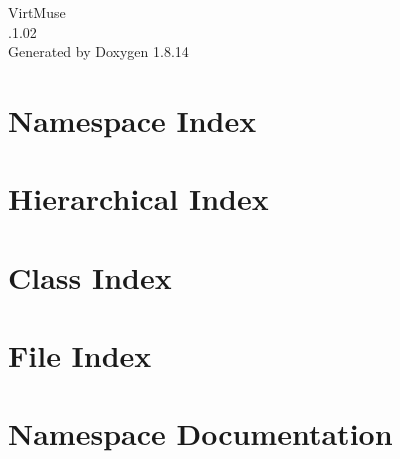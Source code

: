 \documentclass[twoside]{book}
\newcommand{\+}{\discretionary{\mbox{\scriptsize$\hookleftarrow$}}{}{}}
\newcommand{\clearemptydoublepage}{%
  \newpage{\pagestyle{empty}\cleardoublepage}%
}
\begin{document}
\hypersetup{pageanchor=false,
             bookmarksnumbered=true,
             pdfencoding=unicode
            }
\begin{titlepage}
\vspace*{7cm}
\begin{center}%
{\Large Virt\+Muse \\[1ex]\large .1.\+02 }\\
\vspace*{1cm}
{\large Generated by Doxygen 1.8.14}\\
\end{center}
\end{titlepage}
\clearemptydoublepage
{}
\tableofcontents
\clearemptydoublepage
{}
\hypersetup{pageanchor=true}

\chapter{Namespace Index}

\chapter{Hierarchical Index}

\chapter{Class Index}

\chapter{File Index}

\chapter{Namespace Documentation}

\end{document}
